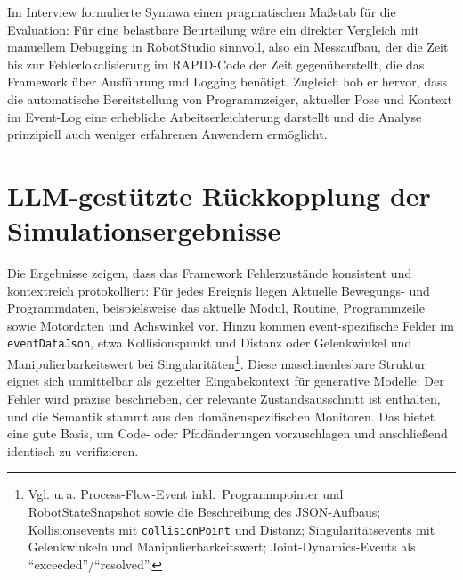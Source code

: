 {  Im Interview formulierte Syniawa einen pragmatischen Maßstab für
  die Evaluation:
  Für eine belastbare Beurteilung wäre ein direkter Vergleich mit manuellem
  Debugging in RobotStudio sinnvoll, also ein Messaufbau, der die Zeit bis zur
  Fehlerlokalisierung im RAPID-Code der Zeit gegenüberstellt, die das Framework
  über Ausführung und Logging benötigt. Zugleich hob er hervor, dass die
  automatische Bereitstellung von Programmzeiger, aktueller Pose und Kontext im
  Event-Log eine erhebliche Arbeitserleichterung darstellt und die Analyse
  prinzipiell auch weniger erfahrenen Anwendern ermöglicht.

  \section{LLM-gestützte Rückkopplung der Simulationsergebnisse}

  Die Ergebnisse zeigen, dass das Framework Fehlerzustände konsistent
  und kontextreich protokolliert: Für jedes Ereignis liegen
  Aktuelle Bewegungs- und Programmdaten, beispielsweise das aktuelle
  Modul, Routine,
  Programmzeile sowie Motordaten und Achswinkel vor. Hinzu kommen
  event-spezifische Felder im \texttt{eventDataJson}, etwa
  Kollisionspunkt und Distanz oder Gelenkwinkel und
  Manipulierbarkeitswert bei Singularitäten\footnote{Vgl. u.\,a.
    Process-Flow-Event inkl.\ Programmpointer und RobotStateSnapshot
    sowie die Beschreibung des JSON-Aufbaus; Kollisionsevents mit
    \texttt{collisionPoint} und Distanz; Singularitätsevents mit
    Gelenkwinkeln und Manipulierbarkeitswert; Joint-Dynamics-Events als
  \enquote{exceeded}/\enquote{resolved}.}. Diese maschinenlesbare
  Struktur eignet sich unmittelbar als gezielter Eingabekontext für
  generative Modelle: Der Fehler wird präzise beschrieben, der
  relevante Zustandsausschnitt ist enthalten, und die Semantik stammt
  aus den domänenspezifischen Monitoren. Das bietet eine gute Basis, um Code-
  oder Pfadänderungen vorzuschlagen und anschließend identisch zu
  verifizieren.

}
